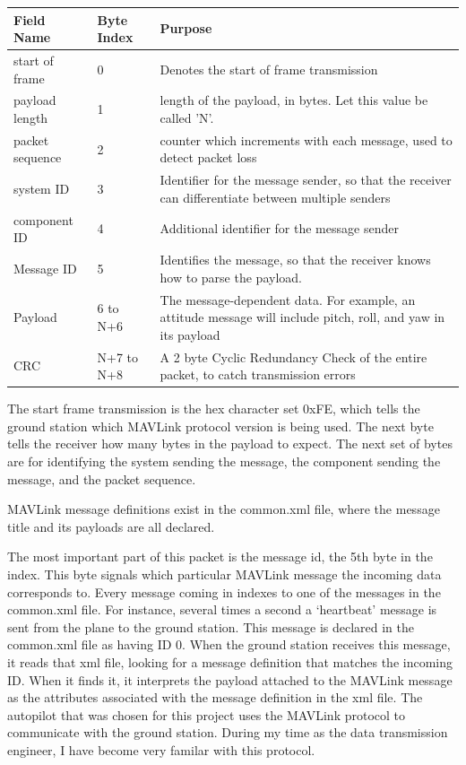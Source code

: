 \documentclass[12pt,journal,compsoc]{IEEEtran}
\begin{document}
\begin{table}[h!]
\centering

\begin{tabular}{|p{1.5cm}|p{0.9cm}|p{5cm}|}
\hline
Field Name & Byte Index & Purpose\\
\hline
start of frame & 0 & Denotes the start of frame transmission \\
\hline
payload length & 1 & length of the payload, in bytes. Let this value be called 'N'. \\
\hline
packet sequence & 2 & counter which increments with each message, used to detect packet loss \\
\hline
system ID & 3 & Identifier for the message sender, so that the receiver can differentiate between multiple senders\\
\hline
component ID & 4 & Additional identifier for the message sender\\
\hline
Message ID & 5 & Identifies the message, so that the receiver knows how to parse the payload.\\
\hline
Payload & 6 to N+6 & The message-dependent data. For example, an attitude message will include pitch, roll, and yaw in its payload\\
\hline
CRC & N+7 to N+8 & A 2 byte Cyclic Redundancy Check of the entire packet, to catch transmission errors\\
\hline
\end{tabular}
\label{x8rChannels}
\end{table}

The start frame transmission is the hex character set 0xFE, which tells the ground station which MAVLink protocol version is being used. The next byte tells the receiver how many bytes in the payload to expect. The next set of bytes are for identifying the system sending the message, the component sending the message, and the packet sequence.

MAVLink message definitions exist in the common.xml file, where the message title and its payloads are all declared.

The most important part of this packet is the message id, the 5th byte in the index. This byte signals which particular MAVLink message the incoming data corresponds to. Every message coming in indexes to one of the messages in the common.xml file. For instance, several times a second a `heartbeat' message is sent from the plane to the ground station. This message is declared in the common.xml file as having ID 0. When the ground station receives this message, it reads that xml file, looking for a message definition that matches the incoming ID. When it finds it, it interprets the payload attached to the MAVLink message as the attributes associated with the message definition in the xml file. 
The autopilot that was chosen for this project uses the MAVLink protocol to communicate with the ground station. During my time as the data transmission engineer, I have become very familar with this protocol.
\end{document}
